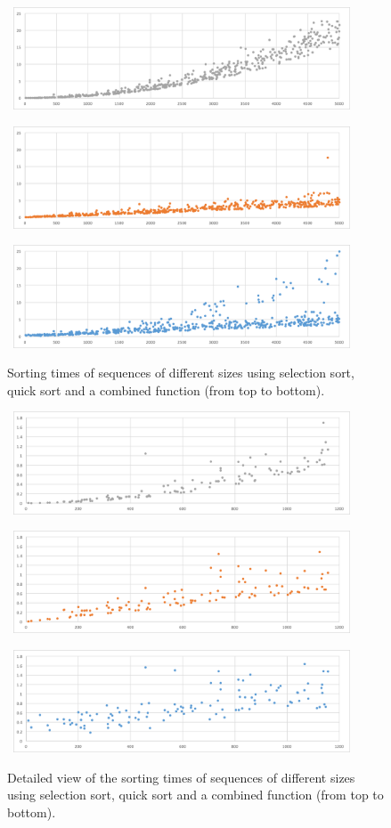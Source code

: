 \begin{figure}[h!]
	\captionsetup{justification=centering,margin=0.5cm}
\centerline{
	\mbox{
		\includegraphics[width=100mm]{./img/sort_all_select.png}
	}
}
\centerline{
	\mbox{
		\includegraphics[width=100mm]{./img/sort_all_quick.png}
	}
}
\centerline{
	\mbox{
		\includegraphics[width=100mm]{./img/sort_all_combined.png}
	}
}
	\caption{Sorting times of sequences of different sizes using selection sort, quick sort and a combined function (from top to bottom).}
	\label{fig:sorting_graph_all}
\end{figure}

\begin{figure}[h!]
	\captionsetup{justification=centering,margin=0.5cm}
	\centerline{
		\mbox{
			\includegraphics[width=100mm]{./img/sort_start_select.png}
		}
	}
	\centerline{
		\mbox{
			\includegraphics[width=100mm]{./img/sort_start_quick.png}
		}
	}
	\centerline{
		\mbox{
			\includegraphics[width=100mm]{./img/sort_start_combined.png}
		}
	}
	\caption{Detailed view of the sorting times of sequences of different sizes using selection sort, quick sort and a combined function (from top to bottom).}
	\label{fig:sorting_graph_start}
\end{figure}

